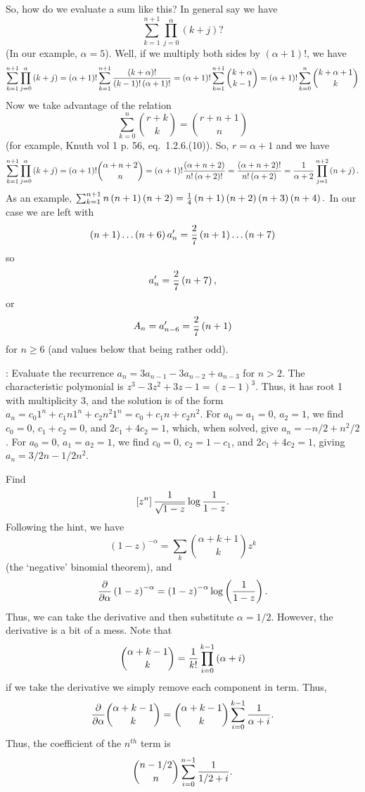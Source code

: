So, how do we evaluate a sum like this?  In general say we have
$$
 \sum_{k=1}^{n+1} \prod_{j=0}^{\alpha} \left(k + j\right)?
$$
(In our example, $\alpha = 5$).  Well, if we multiply both sides by 
$\left(\alpha + 1\right) !$, we have
$$
 \sum_{k=1}^{n+1} \prod_{j=0}^{\alpha} \left(k + j\right) =
 \left(\alpha + 1\right)! \sum_{k=1}^{n+1} {\left(k + \alpha\right)!
   \over \left(k - 1\right)! \left(\alpha + 1\right)!} =
    \left(\alpha + 1\right)! \sum_{k=1}^{n+1} {k + \alpha \choose k - 1}
     = \left(\alpha + 1\right)! \sum_{k=0}^{n} {k + \alpha + 1 \choose k}
$$
Now we take advantage of the relation
$$
 \sum_{k=0}^n {r + k \choose k} = {r + n + 1 \choose n}
$$
(for example, Knuth vol 1 p. 56, eq.~1.2.6.(10)).  So, $r=\alpha + 1$
and we have
$$
  \sum_{k=1}^{n+1} \prod_{j=0}^{\alpha} \left(k + j\right) =
  \left(\alpha + 1\right)! {\alpha + n + 2 \choose n} =
  \left(\alpha + 1\right)! {\left(\alpha + n + 2\right) \over n! \left(\alpha + 2\right)!} =
  { \left(\alpha + n + 2\right)! \over n! \left(\alpha + 2\right)}
  = {1 \over \alpha + 2} \prod_{j=1}^{\alpha + 2} \left(n + j\right).
$$
As an example, $\sum_{k=1}^{n+1} n \left(n + 1\right) \left(n + 2\right)
 = {1 \over 4} \left(n + 1\right)\left(n + 2\right) \left(n + 3\right) \left(n + 4\right).$
 In our case we are left with
$$
\left(n+1\right)\ldots\left(n+6\right) a^{\prime}_n = {2 \over 7}
\left(n + 1\right) \ldots \left(n + 7\right)
$$
so
$$ 
 a^{\prime}_n = {2 \over 7} \left(n + 7\right),
$$
or
$$
 A_n = a^{\prime}_{n-6} = {2 \over 7} \left(n + 1\right)
$$
for $n \ge 6$ (and values below that being rather odd).

\vskip 0.08in : Evaluate the
recurrence $a_n = 3 a_{n-1} - 3 a_{n-2} + a_{n-3}$ for $n > 2$.\hfil\break
The characteristic polymonial is $z^3 - 3 z^2 + 3 z - 1 = \left(z - 1\right)^3$.
Thus, it has root 1 with multiplicity 3, and the solution is of the form
$a_n = c_0 1^n + c_1 n 1^n + c_2 n^2 1^n = c_0 + c_1 n + c_2 n^2$.
For $a_0 = a_1 = 0$, $a_2 = 1$, we find $c_0 = 0$, $c_1 + c_2 = 0$,
and $2 c_1 + 4 c_2 = 1$, which, when solved, give $a_n = -n / 2 + n^2/2$.
For $a_0 = 0$, $a_1 = a_2 = 1$, we find $c_0 = 0$, $c_2 = 1 - c_1$,
and $2 c_1 + 4 c_2 = 1$, giving $a_n = 3/2 n - 1/2 n^2$.

\vskip 0.08in  Find
$$
 \left[z^n\right] {1 \over \sqrt{1 - z}} \log {1 \over 1 - z}.
$$
Following the hint, we
have
$$
 \left(1 - z\right)^{-\alpha} = \sum_k {\alpha + k + 1 \choose k} z^k
$$
(the `negative' binomial theorem), and
$$
 {\partial \over \partial \alpha} \left(1 - z \right)^{-\alpha}
  = \left(1 - z\right)^{-\alpha} \log \left({1 \over 1 - z}\right).
$$
Thus, we can take the derivative and then substitute $\alpha = 1/2$.
However, the derivative is a bit of a mess.  Note that
$$
  {\alpha + k - 1 \choose k} = {1 \over k!} \prod_{i=0}^{k-1} \left(\alpha + i\right)
$$
if we take the derivative we simply remove each component in term.  Thus,
$$
 {\partial \over \partial \alpha} {\alpha + k - 1 \choose k} =
  {\alpha + k - 1 \choose k} \sum_{i=0}^{k-1} {1 \over \alpha + i}.
$$
Thus, the coefficient of the $n^{th}$ term is
$$
 {n - 1/2 \choose n} \sum_{i=0}^{n-1} {1 \over 1/2 + i}.
$$


